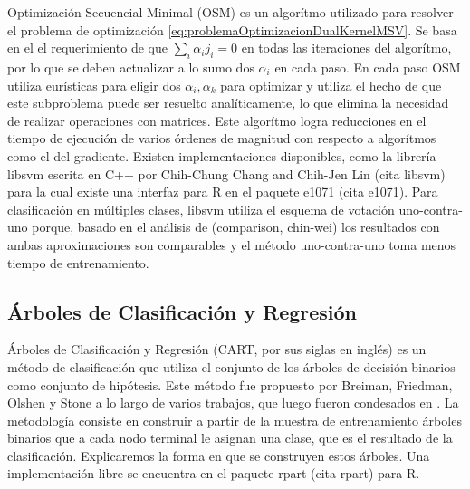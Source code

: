 \documentclass[letterpaper,12pt]{book}
\begin{document}
Optimización Secuencial Minimal (OSM) es un algorítmo utilizado para resolver el problema de optimización \ref{eq:problemaOptimizacionDualKernelMSV}. Se basa en el el requerimiento de que $\sum_i\alpha_ij_i = 0$ en todas las iteraciones del algorítmo, por lo que se deben actualizar a lo sumo dos $\alpha_i$ en cada paso. En cada paso OSM utiliza eurísticas para eligir dos $\alpha_i, \alpha_k$ para optimizar y utiliza el hecho de que este subproblema puede ser resuelto analíticamente, lo que elimina la necesidad de realizar operaciones con matrices. Este algorítmo logra reducciones en el tiempo de ejecución de varios órdenes de magnitud con respecto a algorítmos como el del gradiente. Existen implementaciones disponibles, como la librería libsvm escrita en C++ por Chih-Chung Chang and Chih-Jen Lin (cita libsvm) para la cual existe una interfaz para R en el paquete e1071 (cita e1071). Para clasificación en múltiples clases, libsvm utiliza el esquema de votación uno-contra-uno porque, basado en el análisis de (comparison, chin-wei) los resultados con ambas aproximaciones son comparables y el método uno-contra-uno toma menos tiempo de entrenamiento.

\subsection{Árboles de Clasificación y Regresión}

Árboles de Clasificación y Regresión (CART, por sus siglas en inglés) es un método de clasificación que utiliza el conjunto de los árboles de decisión binarios como conjunto de hipótesis. Este método fue propuesto por Breiman, Friedman, Olshen y Stone a lo largo de varios trabajos, que luego fueron condesados en \cite{breiman_classification_1984}. La metodología consiste en construir a partir de la muestra de entrenamiento árboles binarios que a cada nodo terminal le asignan una clase, que es el resultado de la clasificación. Explicaremos la forma en que se construyen estos árboles. Una implementación libre se encuentra en el paquete rpart (cita rpart) para R.
\end{document}
